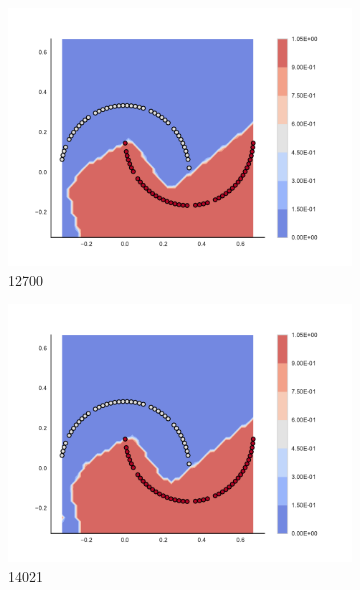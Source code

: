 \begin{figure}[h]
\begin{subfigure}[b]{0.09\textwidth}
    \includegraphics[clip, trim=2.35cm 1.75cm 4.5cm 0cm,width=\textwidth]{img/convergence/12700.pdf}
    \caption{12700}
    \label{fig:convergence_12700}
\end{subfigure}
%
\begin{subfigure}[b]{0.09\textwidth}
    \includegraphics[clip, trim=2.35cm 1.75cm 4.5cm 0cm,width=\textwidth]{img/convergence/14021.pdf}
    \caption{14021}
    \label{fig:convergence_14021}
\end{subfigure}
%
\begin{subfigure}[b]{0.09\textwidth}

\end{subfigure}
\end{figure}
